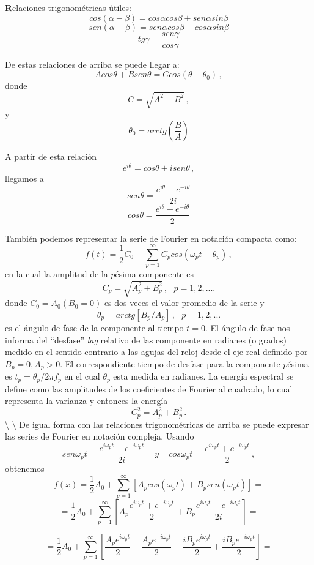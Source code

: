 \documentclass[
]{agujournal2019}
\begin{document}
\begin{framed}
{\noindent \textbf Relaciones trigonométricas útiles:}
\\
$$cos(\alpha-\beta)=cos\alpha cos\beta + sen\alpha sin\beta$$
$$sen(\alpha-\beta)=sen\alpha cos\beta - cos\alpha sin\beta$$
$$tg\gamma=\frac{sen\gamma}{cos\gamma}$$

De estas relaciones de arriba se puede llegar a:
$$Acos\theta + Bsen\theta=Ccos(\theta-\theta_0)\,,$$
donde
$$C=\sqrt{A^2 + B^2}\,,$$
y
$$\theta_0=arctg{\left(\frac{B}{A}\right)}$$

A partir de esta relación
$$e^{i\theta}=cos\theta+isen\theta\,,$$
llegamos a
$$sen\theta=\frac{e^{i\theta}-e^{-i\theta}}{2i}$$
$$cos\theta=\frac{e^{i\theta}+e^{-i\theta}}{2}$$
\end{framed}

También podemos representar la serie de Fourier en notación compacta
como:
\[f(t)=\frac{1}{2}C_0 +\sum\limits^\infty_{p=1}C_p cos(\omega_p t - \theta_p)\,,\]
en la cual la amplitud de la \(p\)ésima componente es
\[C_p=\sqrt{A_p^2+B_p^2}\,,\,\,\,\,p=1,2,....\] donde
\(C_0=A_0 (B_0=0)\) es dos veces el valor promedio de la serie y
\[\theta_p=arctg[B_p/A_p]\,,\,\,\,\,p=1,2,...\] es el ángulo de fase de
la componente al tiempo \(t=0\). El ángulo de fase nos informa del
``desfase'' \emph{lag} relativo de las componente en radianes (o grados)
medido en el sentido contrario a las agujas del reloj desde el eje real
definido por \(B_p=0, A_p>0\). El correspondiente tiempo de desfase para
la componente \(p\)ésima es \(t_p=\theta_p/2\pi f_p\) en el cual
\(\theta_p\) esta medida en radianes. La energía espectral se define
como las amplitudes de los coeficientes de Fourier al cuadrado, lo cual
representa la varianza y entonces la energía \[C^2_p=A_p^2 + B_p^2\,.\]
\textbackslash{} \textbackslash{} De igual forma con las relaciones
trigonométricas de arriba se puede expresar las series de Fourier en
notación compleja. Usando
\[sen\omega_p t=\frac{e^{i\omega_pt}-e^{-i\omega_pt}}{2i}\,\,\,\,\,\,\,y\,\,\,\,\,\,\,
cos\omega_p t=\frac{e^{i\omega_pt}+e^{-i\omega_pt}}{2}\,,\] obtenemos
\[f(x)=\frac{1}{2}A_0 +\sum\limits^\infty_{p=1}[A_p cos(\omega_p t) + B_p sen(\omega_p t)]=\]
\[=\frac{1}{2}A_0 +\sum\limits^\infty_{p=1}\left[ A_p \frac{e^{i\omega_pt}+e^{-i\omega_pt}}{2} + B_p \frac{e^{i\omega_pt}-e^{-i\omega_pt}}{2i}\right]=\]

\[=\frac{1}{2}A_0+\sum\limits^\infty_{p=1}\left[\frac{A_p e^{i\omega_p t}}{2} + \frac{A_p e^{-i\omega_p t}}{2} -
\frac{iB_p e^{i\omega_p t}}{2} + \frac{iB_p e^{-i\omega_p t}}{2} \right]=\]
\end{document}
